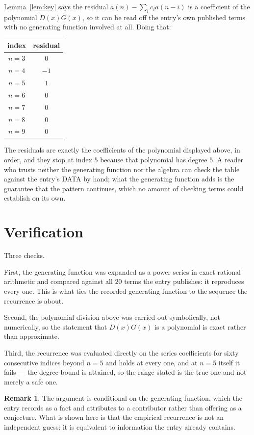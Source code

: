 \documentclass[11pt,a4paper]{article}
\theoremstyle{plain}
\theoremstyle{definition}
\newtheorem{remark}[theorem]{Remark}
\begin{document}
Lemma~\ref{lem:key} says the residual $a(n)-\sum_ic_ia(n-i)$ is a coefficient of the
polynomial $D(x)G(x)$, so it can be read off the entry's own published terms with no
generating function involved at all. Doing that:
\begin{center}
\begin{tabular}{cc}
index & residual \\ \hline
$n=3$ & $0$ \\
$n=4$ & $-1$ \\
$n=5$ & $1$ \\
$n=6$ & $0$ \\
$n=7$ & $0$ \\
$n=8$ & $0$ \\
$n=9$ & $0$
\end{tabular}
\end{center}
The residuals are exactly the coefficients of the polynomial displayed above, in order, and
they stop at index $5$ because that polynomial has degree $5$. A reader who trusts
neither the generating function nor the algebra can check the table against the entry's DATA
by hand; what the generating function adds is the guarantee that the pattern continues, which
no amount of checking terms could establish on its own.

\section{Verification}

Three checks.

First, the generating function was expanded as a power series in exact rational arithmetic and
compared against all $20$ terms the entry publishes: it reproduces every one. This is
what ties the recorded generating function to the sequence the recurrence is about.

Second, the polynomial division above was carried out symbolically, not numerically, so the
statement that $D(x)G(x)$ is a polynomial is exact rather than approximate.

Third, the recurrence was evaluated directly on the series coefficients for sixty consecutive
indices beyond $n=5$ and holds at every one, and at $n=5$ itself it fails --- the
degree bound is attained, so the range stated is the true one and not merely a safe one.

\begin{remark}
The argument is conditional on the generating function, which the entry records as a fact and
attributes to a contributor rather than offering as a conjecture. What is shown here is that
the empirical recurrence is not an independent guess: it is equivalent to information the
entry already contains.
\end{remark}
\end{document}
